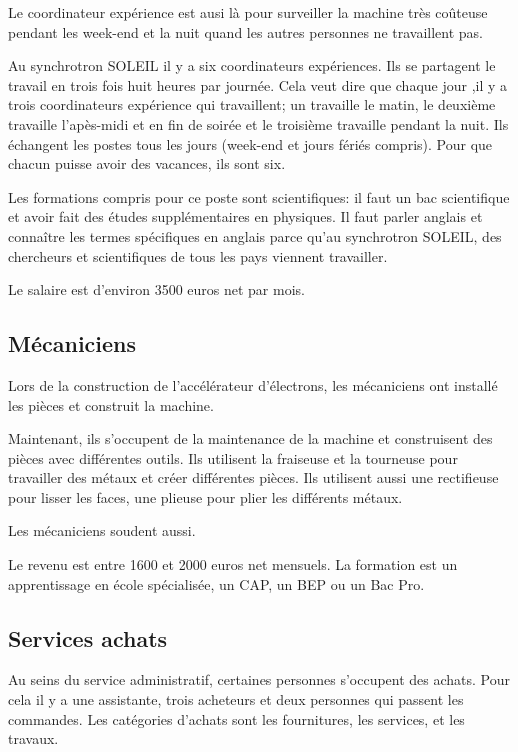 			Le coordinateur expérience est ausi là pour surveiller la machine très coûteuse pendant les week-end et la nuit quand les autres personnes ne travaillent pas.
			
			Au synchrotron SOLEIL il y a six coordinateurs expériences. Ils se partagent le travail en trois fois huit heures par journée. Cela veut dire que chaque jour ,il y a trois coordinateurs expérience qui travaillent; un travaille le matin, le deuxième travaille l'apès-midi et en fin de soirée et le troisième travaille pendant la nuit. Ils échangent les postes tous les jours (week-end et jours fériés compris). Pour que chacun puisse avoir des vacances, ils sont six.
			
			Les formations compris pour ce poste sont scientifiques: il faut un bac scientifique et avoir fait des études supplémentaires en physiques. Il faut parler anglais et connaître les termes spécifiques en anglais parce qu'au synchrotron SOLEIL, des chercheurs et scientifiques de tous les pays viennent travailler.
			
			Le salaire est d'environ 3500 euros net par mois.
		
		\subsection{Mécaniciens}
			Lors de la construction de l'accélérateur d'électrons, les mécaniciens ont installé les pièces et construit la machine. 
			
			Maintenant, ils s'occupent de la maintenance de la machine et construisent des pièces avec différentes outils. Ils utilisent la fraiseuse et la tourneuse pour travailler des métaux et créer différentes pièces. Ils utilisent aussi une rectifieuse pour lisser les faces, une plieuse pour plier les différents métaux. 

			Les mécaniciens soudent aussi.
			
			Le revenu est entre 1600 et 2000 euros net mensuels. La formation est un apprentissage en école spécialisée, un CAP, un BEP ou un Bac Pro.
		
		\subsection{Services achats}
			Au seins du service administratif, certaines personnes s'occupent des achats. Pour cela il y a une assistante, trois acheteurs et deux personnes qui passent les commandes. Les catégories d'achats sont les fournitures, les services, et les travaux.
		
